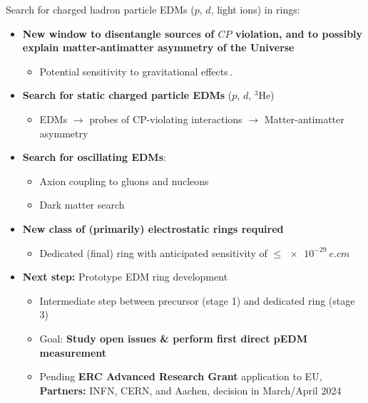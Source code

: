 \begin{frame}[t,allowframebreaks]
\begin{alertblock}{Search for charged hadron particle EDMs ($p$, $d$, light ions) in rings:}
\begin{itemize}
 \item \textbf{New window to disentangle sources of $CP$ violation, and to possibly explain matter-antimatter asymmetry of the Universe}
 \begin{itemize}
 	\item[-] Potential sensitivity to gravitational effects\,\textcolor{PineGreen}{\small \cite{CPEDM:2019nwp,ariesWS:2021}}. 	
 \end{itemize}
\item \textbf{Search for static charged particle EDMs} ($p$, $d$, $^3$He) 
 	\begin{itemize}
 		\item[-] EDMs $\rightarrow$ probes of CP-violating interactions $\rightarrow$ Matter-antimatter asymmetry
 	\end{itemize}
 	\item \textbf{Search for oscillating EDMs}:
 	\begin{itemize}
 		\item[-] Axion coupling to gluons and nucleons
 		\item[-] Dark matter search
 	\end{itemize}
 	\item \textbf{New class of (primarily) electrostatic rings required }
 	\begin{itemize}
 		\item[-] Dedicated (final) ring with anticipated sensitivity of $\leq  \SI{e-29}{e.cm}$
 	\end{itemize}
 	\item \textbf{Next step:} Prototype EDM ring development
 	\begin{itemize}
 		\item[-] Intermediate step between precursor (stage 1) and dedicated ring (stage 3)
		\item[-] Goal: \textbf{Study open issues \& perform first direct pEDM measurement}
		\item[-] Pending \textbf{ERC Advanced Research Grant} application to EU, \textbf{Partners:} INFN, CERN, and Aachen, decision in March/April 2024
 	\end{itemize}	
\end{itemize}
\end{alertblock}


\end{frame}


